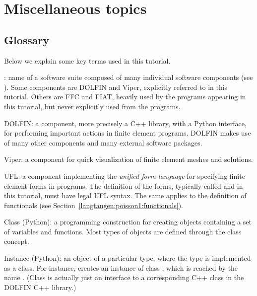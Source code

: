 \section{Miscellaneous topics}


\subsection{Glossary}

Below we explain some key terms used in this tutorial.
%
\begin{trivlist}
  \item[\fenics:] name of a software suite composed of many individual
  software components (see ). Some components are
  DOLFIN and Viper, explicitly referred to in this tutorial. Others are
  FFC and FIAT, heavily used by the programs appearing in this tutorial,
  but never explicitly used from the programs.

  \item[DOLFIN:] a \fenics{} component, more precisely a C++ library,
  with a Python interface, for performing important actions in finite
  element programs. DOLFIN makes use of many other \fenics{} components
  and many external software packages.

  \item[Viper:] a \fenics{} component for quick visualization of finite
  element meshes and solutions.

  \item[UFL:] a \fenics{} component implementing the \emph{unified
  form language} for specifying finite element forms in \fenics{}
  programs.  The definition of the forms, typically called
   and  in this tutorial, must have legal UFL
  syntax. The same applies to the definition of functionals (see
  Section~\ref{langtangen:poisson1:functionals}).

  \item[Class (Python):] a programming construction for creating objects
  containing a set of variables and functions. Most types of \fenics{}
  objects are defined through the class concept.

  \item[Instance (Python):] an object of a particular type, where the type
  is implemented as a class. For instance, 
  creates an instance of class , which is reached by
  the name . (Class  is actually just an
  interface to a corresponding C++ class in the DOLFIN C++ library.)


\end{trivlist}
